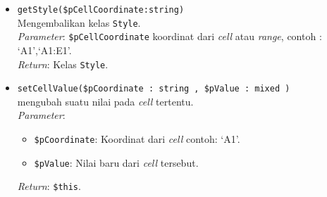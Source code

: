 \begin{itemize}
	\item \texttt{getStyle(\$pCellCoordinate:string)} \\ 
	Mengembalikan kelas \texttt{Style}.\\
	\textit{Parameter}: \texttt{\$pCellCoordinate} koordinat dari \textit{cell} atau \textit{range}, contoh : `A1',`A1:E1'.\\
	\textit{Return}: Kelas \texttt{Style}.
	
	\item \texttt{setCellValue(\$pCoordinate : string , \$pValue : mixed )}\\ 
	mengubah suatu nilai pada \textit{cell} tertentu. \\ 
	\textit{Parameter}:
	\begin{itemize}
		\item \texttt{\$pCoordinate}: Koordinat dari \textit{cell} contoh: `A1'.
		\item \texttt{\$pValue}: Nilai baru dari \textit{cell} tersebut.
	\end{itemize}
	\textit{Return}: \texttt{\$this}.
	

\end{itemize}
